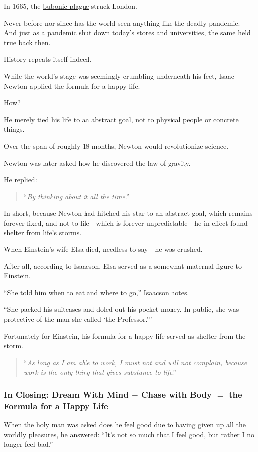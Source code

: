 \documentclass{article}
\begin{document}
%
In 1665, the \href{https://www.historic-uk.com/HistoryUK/HistoryofEngland/The-Great-Plague/}{bubonic plague} struck London.

Never before nor since has the world seen anything like the deadly pandemic. And just as a pandemic shut down today's stores and universities, the same held true back then.

History repeats itself indeed.

%
While the world's stage was seemingly crumbling underneath his feet, Isaac Newton applied the formula for a happy life.

How?

He merely tied his life to an abstract goal, not to physical people or concrete things.

Over the span of roughly 18 months, Newton would revolutionize science.

%
Newton was later asked how he discovered the law of gravity.

He replied:
\begin{quotation}
	``\textit{By thinking about it all the time}.''
\end{quotation}
In short, because Newton had hitched his star to an abstract goal, which remains forever fixed, and not to life - which is forever unpredictable - he in effect found shelter from life's storms.

%
When Einstein's wife Elsa died, needless to say - he was crushed.

After all, according to Isaacson, Elsa served as a somewhat maternal figure to Einstein.

%
``She told him when to eat and where to go,'' \href{https://onlinereadfreenovel.com/walter-isaacson/page,171,42091-walter_isaacson_great_innovators_e-book_boxed_set.html}{Isaacson notes}.

``She packed his suitcases and doled out his pocket money. In public, she was protective of the man she called `the Professor.'''

%
Fortunately for Einstein, his formula for a happy life served as shelter from the storm.

\begin{quotation}
	``\textit{As long as I am able to work, I must not and will not complain, because work is the only thing that gives substance to life}.''
\end{quotation}

\subsubsection{In Closing: Dream With Mind $+$ Chase with Body $=$ the Formula for a Happy Life}
When the holy man was asked does he feel good due to having given up all the worldly pleasures, he answered: ``It's not so much that I feel good, but rather I no longer feel bad.''
\end{document}
